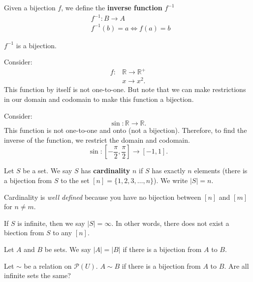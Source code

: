 \begin{definition}
	Given a bijection \( f \), we define the \textbf{inverse function} \( f^{-1} \)
\begin{align*}
	& f^{-1} \colon B \to A \\
	& f^{-1}(b) = a \iff f(a) = b
\end{align*}
\begin{property}
	\( f^{-1} \) is a bijection.
\end{property}
\end{definition}

\begin{eg}
	Consider:
	\begin{align*}
		f \colon & \mathbb{R} \to \mathbb{R}^+ \\
						 & x \to  x^2
	.\end{align*}
	This function by itself is not one-to-one. But note that we can make restrictions in our domain and codomain to make this function a bijection.
\end{eg}
\begin{eg}
	Consider:
	\[
		\sin \colon \mathbb{R} \to \mathbb{R}
	.\] 
	This function is not one-to-one and onto (not a bijection). Therefore, to find the inverse of the function, we restrict the domain and codomain.	\[
		\sin \colon \left[-\frac{\pi}{2}, \frac{\pi}{2}\right] \to [-1,1]
	.\] 
\end{eg}

\begin{definition}
	Let \( S \) be a set. We say \( S \) has \textbf{cardinality} \( n \) if \( S \) has exactly \( n \) elements (there is a bijection from \( S \) to the set \( [n]=\{1, 2, 3, \ldots , n\}   \)). We write \( |S|=n \).
\end{definition}
\begin{remark}
	Cardinality is \textit{well defined} because you have no bijection between \( [n] \) and \( [m] \) for \( n \neq  m \).
\end{remark}
\begin{remark}
	If \( S \) is infinite, then we say \( |S| = \infty \). In other words, there does not exist a biection from \( S \) to any \( [n] \).
\end{remark}

\begin{definition}
	Let \( A \) and \( B \) be sets. We say \( |A| = |B| \) if there is a bijection from \( A \) to \( B \).
\end{definition}

\begin{eg}
	Let \( \sim \) be a relation on \( \mathcal{P}(U) \). \( A \sim B \) if there is a bijection from \( A \) to \( B \). Are all infinite sets the same?
\end{eg}

